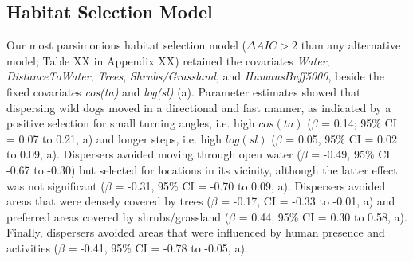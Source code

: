 \documentclass[abstract=on,10pt,a4paper,bibliography=totocnumbered]{article}
\begin{document}
\subsection{Habitat Selection Model}
Our most parsimonious habitat selection model (\(\Delta AIC > 2\) than any
alternative model; Table XX in Appendix XX) retained the covariates
\textit{Water}, \textit{DistanceToWater}, \textit{Trees},
\textit{Shrubs/Grassland}, and \textit{HumansBuff5000}, beside the fixed
covariates \textit{cos(ta)} and \textit{log(sl)} (a).
Parameter estimates showed that dispersing wild dogs moved in a directional and
fast manner, as indicated by a positive selection for small turning angles, i.e.
high \(cos(ta)\) (\(\beta\) = 0.14; 95\% CI = 0.07 to 0.21,
a) and longer steps, i.e. high \(log(sl)\) (\(\beta\)
= 0.05, 95\% CI = 0.02 to 0.09, a). Dispersers avoided
moving through open water (\(\beta\) = -0.49, 95\% CI -0.67 to -0.30) but
selected for locations in its vicinity, although the latter effect was not
significant (\(\beta\) = -0.31, 95\% CI = -0.70 to 0.09,
a). Dispersers avoided areas that were densely covered
by trees (\(\beta\) = -0.17, CI = -0.33 to -0.01, a)
and preferred areas covered by shrubs/grassland (\(\beta\) = 0.44, 95\% CI =
0.30 to 0.58, a). Finally, dispersers avoided areas
that were influenced by human presence and activities (\(\beta\) = -0.41, 95\%
CI = -0.78 to -0.05, a).
\end{document}
